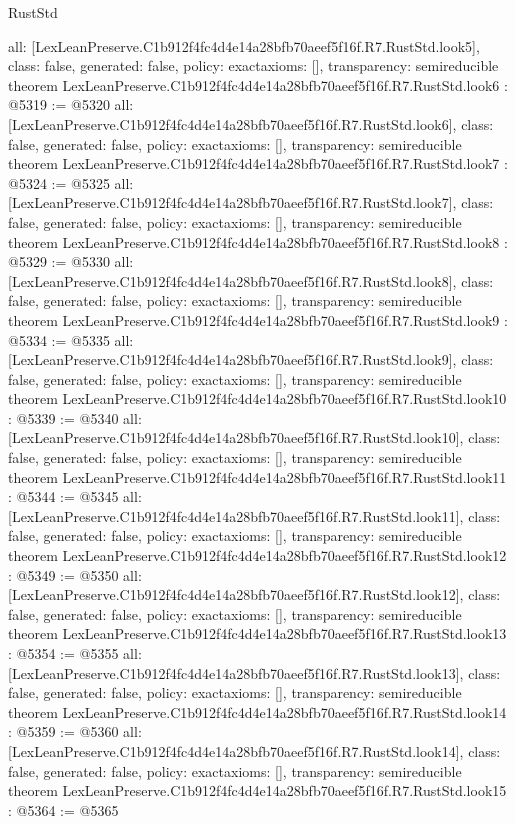 \begin{lexlean}{RustStd}
\begin{coremodule}
{  all: [LexLeanPreserve.C1b912f4fc4d4e14a28bfb70aeef5f16f.R7.RustStd.look5],
  class: false,
  generated: false,
  policy: exact{axioms: []},
  transparency: semireducible
}
theorem LexLeanPreserve.C1b912f4fc4d4e14a28bfb70aeef5f16f.R7.RustStd.look6 : @5319 := @5320 {
  all: [LexLeanPreserve.C1b912f4fc4d4e14a28bfb70aeef5f16f.R7.RustStd.look6],
  class: false,
  generated: false,
  policy: exact{axioms: []},
  transparency: semireducible
}
theorem LexLeanPreserve.C1b912f4fc4d4e14a28bfb70aeef5f16f.R7.RustStd.look7 : @5324 := @5325 {
  all: [LexLeanPreserve.C1b912f4fc4d4e14a28bfb70aeef5f16f.R7.RustStd.look7],
  class: false,
  generated: false,
  policy: exact{axioms: []},
  transparency: semireducible
}
theorem LexLeanPreserve.C1b912f4fc4d4e14a28bfb70aeef5f16f.R7.RustStd.look8 : @5329 := @5330 {
  all: [LexLeanPreserve.C1b912f4fc4d4e14a28bfb70aeef5f16f.R7.RustStd.look8],
  class: false,
  generated: false,
  policy: exact{axioms: []},
  transparency: semireducible
}
theorem LexLeanPreserve.C1b912f4fc4d4e14a28bfb70aeef5f16f.R7.RustStd.look9 : @5334 := @5335 {
  all: [LexLeanPreserve.C1b912f4fc4d4e14a28bfb70aeef5f16f.R7.RustStd.look9],
  class: false,
  generated: false,
  policy: exact{axioms: []},
  transparency: semireducible
}
theorem LexLeanPreserve.C1b912f4fc4d4e14a28bfb70aeef5f16f.R7.RustStd.look10 : @5339 := @5340 {
  all: [LexLeanPreserve.C1b912f4fc4d4e14a28bfb70aeef5f16f.R7.RustStd.look10],
  class: false,
  generated: false,
  policy: exact{axioms: []},
  transparency: semireducible
}
theorem LexLeanPreserve.C1b912f4fc4d4e14a28bfb70aeef5f16f.R7.RustStd.look11 : @5344 := @5345 {
  all: [LexLeanPreserve.C1b912f4fc4d4e14a28bfb70aeef5f16f.R7.RustStd.look11],
  class: false,
  generated: false,
  policy: exact{axioms: []},
  transparency: semireducible
}
theorem LexLeanPreserve.C1b912f4fc4d4e14a28bfb70aeef5f16f.R7.RustStd.look12 : @5349 := @5350 {
  all: [LexLeanPreserve.C1b912f4fc4d4e14a28bfb70aeef5f16f.R7.RustStd.look12],
  class: false,
  generated: false,
  policy: exact{axioms: []},
  transparency: semireducible
}
theorem LexLeanPreserve.C1b912f4fc4d4e14a28bfb70aeef5f16f.R7.RustStd.look13 : @5354 := @5355 {
  all: [LexLeanPreserve.C1b912f4fc4d4e14a28bfb70aeef5f16f.R7.RustStd.look13],
  class: false,
  generated: false,
  policy: exact{axioms: []},
  transparency: semireducible
}
theorem LexLeanPreserve.C1b912f4fc4d4e14a28bfb70aeef5f16f.R7.RustStd.look14 : @5359 := @5360 {
  all: [LexLeanPreserve.C1b912f4fc4d4e14a28bfb70aeef5f16f.R7.RustStd.look14],
  class: false,
  generated: false,
  policy: exact{axioms: []},
  transparency: semireducible
}
theorem LexLeanPreserve.C1b912f4fc4d4e14a28bfb70aeef5f16f.R7.RustStd.look15 : @5364 := @5365 {
}
\end{coremodule}
\end{lexlean}
